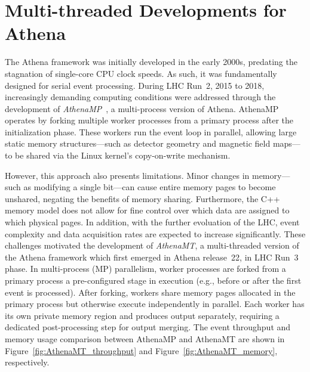 \section{Multi-threaded Developments for Athena}
The Athena framework was initially developed in the early 2000s, predating the stagnation of single-core CPU clock speeds. As such, it was fundamentally designed for serial event processing. During LHC Run~2, 2015 to 2018, increasingly demanding computing conditions were addressed through the development of \textit{AthenaMP}~\cite{AthenaMP}, a multi-process version of Athena. AthenaMP operates by forking multiple worker processes from a primary process after the initialization phase. These workers run the event loop in parallel, allowing large static memory structures—such as detector geometry and magnetic field maps—to be shared via the Linux kernel’s copy-on-write mechanism.

However, this approach also presents limitations. Minor changes in memory—such as modifying a single bit—can cause entire memory pages to become unshared, negating the benefits of memory sharing. Furthermore, the C++ memory model does not allow for fine control over which data are assigned to which physical pages. In addition, with the further evoluation of the LHC, event complexity and data acquisition rates are expected to increase significantly. These challenges motivated the development of \textit{AthenaMT}, a multi-threaded version of the Athena framework which first emerged in Athena release~22, in LHC Run~3 phase. In multi-process (MP) parallelism, worker processes are forked from a primary process a pre-configured stage in execution (e.g., before or after the first event is processed). After forking, workers share memory pages allocated in the primary process but otherwise execute independently in parallel. Each worker has its own private memory region and produces output separately, requiring a dedicated post-processing step for output merging. The event throughput and memory usage comparison between AthenaMP and AthenaMT are shown in Figure~\ref{fig:AthenaMT_throughput} and Figure~\ref{fig:AthenaMT_memory}, respectively.

